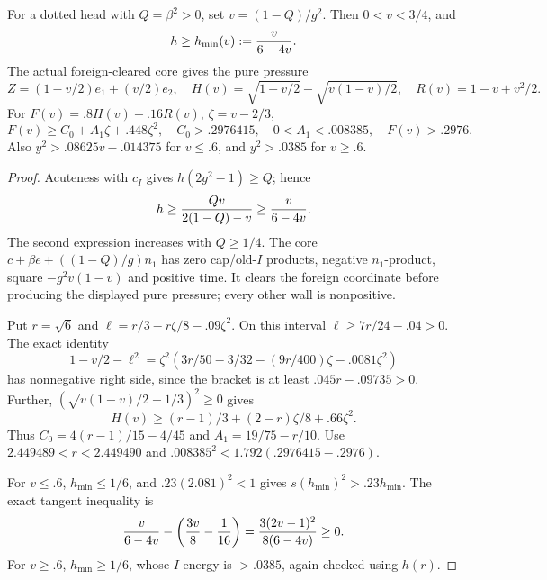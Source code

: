 \begin{lemma}
\label{lem:I-foreign-head-parabola}
For a dotted head with \(Q=\beta^2>0\), set \(v=(1-Q)/g^2\).
Then \(0<v<3/4\), and
\[
 h\ge h_{\min}(v):={v\over6-4v}.
\]
The actual foreign-cleared core gives the pure pressure
\[
 Z=(1-v/2)e_1+(v/2)e_2,\quad
 H(v)=\sqrt{1-v/2}-\sqrt{v(1-v)/2},\quad
 R(v)=1-v+v^2/2.
\]
For \(F(v)=.8H(v)-.16R(v)\), \(\zeta=v-2/3\),
\[
 F(v)\ge C_0+A_1\zeta+.448\zeta^2,\quad
 C_0>.2976415,\quad0<A_1<.008385,\quad F(v)>.2976.
\]
Also \(y^2>.08625v-.014375\) for \(v\le.6\), and
\(y^2>.0385\) for \(v\ge.6\).
\end{lemma}
\begin{proof}
Acuteness with \(c_I\) gives \(h(2g^2-1)\ge Q\); hence
\[
 h\ge{Qv\over2(1-Q)-v}\ge{v\over6-4v}.
\]
The second expression increases with \(Q\ge1/4\).
The core \(c+\beta e+((1-Q)/g)n_1\) has zero cap/old-\(I\)
products, negative \(n_1\)-product, square \(-g^2v(1-v)\)
and positive time. It clears the foreign coordinate before producing
the displayed pure pressure; every other wall is nonpositive.

Put \(r=\sqrt6\) and \(\ell=r/3-r\zeta/8-.09\zeta^2\).
On this interval \(\ell\ge7r/24-.04>0\).
The exact identity
\[
 1-v/2-\ell^2
 =\zeta^2(3r/50-3/32-(9r/400)\zeta-.0081\zeta^2)
\]
has nonnegative right side, since the bracket is at least
\(.045r-.09735>0\). Further,
\((\sqrt{v(1-v)/2}-1/3)^2\ge0\) gives
\[
 H(v)\ge(r-1)/3+(2-r)\zeta/8+.66\zeta^2.
\]
Thus \(C_0=4(r-1)/15-4/45\) and
\(A_1=19/75-r/10\). Use
\(2.449489<r<2.449490\) and
\(.008385^2<1.792(.2976415-.2976)\).

For \(v\le.6\), \(h_{\min}\le1/6\), and
\(.23(2.081)^2<1\) gives \(s(h_{\min})^2>.23h_{\min}\).
The exact tangent inequality is
\[
 {v\over6-4v}-\left({3v\over8}-{1\over16}\right)
 ={3(2v-1)^2\over8(6-4v)}\ge0.
\]
For \(v\ge.6\), \(h_{\min}\ge1/6\), whose \(I\)-energy is
\(>.0385\), again checked using \(h(r)\).
\end{proof}


